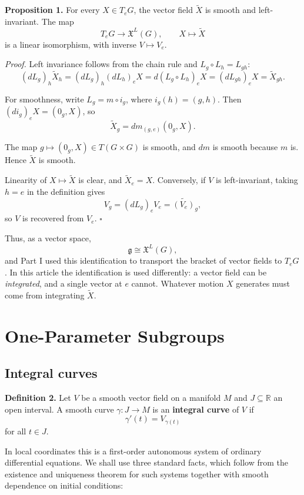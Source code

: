 \documentclass[11pt]{article}
\begin{document}
\textbf{Proposition 1.} For every $X \in T_eG$, the vector field $\widetilde{X}$ is smooth and left-invariant. The map
\[
T_eG \longrightarrow \mathfrak{X}^L(G), \qquad X \longmapsto \widetilde{X}
\]
is a linear isomorphism, with inverse $V \mapsto V_e$.

\emph{Proof.} Left invariance follows from the chain rule and $L_g \circ L_h = L_{gh}$:
\[
(dL_g)_h \widetilde{X}_h = (dL_g)_h (dL_h)_e X = d(L_g \circ L_h)_e X = (dL_{gh})_e X = \widetilde{X}_{gh}.
\]

For smoothness, write $L_g = m \circ i_g$, where $i_g(h) = (g, h)$. Then $(di_g)_e X = (0_g, X)$, so
\[
\widetilde{X}_g = dm_{(g, e)}(0_g, X).
\]

The map $g \mapsto (0_g, X) \in T(G \times G)$ is smooth, and $dm$ is smooth because $m$ is. Hence $\widetilde{X}$ is smooth.

Linearity of $X \mapsto \widetilde{X}$ is clear, and $\widetilde{X}_e = X$. Conversely, if $V$ is left-invariant, taking $h = e$ in the definition gives
\[
V_g = (dL_g)_e V_e = \widetilde{(V_e)}_g,
\]
so $V$ is recovered from $V_e$. $\square$

Thus, as a vector space,
\[
\mathfrak{g} \cong \mathfrak{X}^L(G),
\]
and Part I used this identification to transport the bracket of vector fields to $T_eG$. In this article the identification is used differently: a vector field can be \emph{integrated}, and a single vector at $e$ cannot. Whatever motion $X$ generates must come from integrating $\widetilde{X}$.

\section{One-Parameter Subgroups}

\subsection{Integral curves}

\textbf{Definition 2.} Let $V$ be a smooth vector field on a manifold $M$ and $J \subseteq \mathbb{R}$ an open interval. A smooth curve $\gamma : J \to M$ is an \textbf{integral curve} of $V$ if
\[
\gamma'(t) = V_{\gamma(t)}
\]
for all $t \in J$.

In local coordinates this is a first-order autonomous system of ordinary differential equations. We shall use three standard facts, which follow from the existence and uniqueness theorem for such systems together with smooth dependence on initial conditions:
\end{document}
